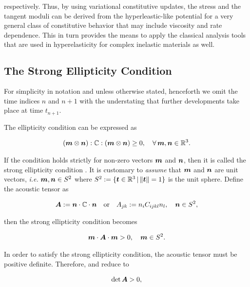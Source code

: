 \documentclass[12pt]{article}
\numberwithin{equation}{section}
\begin{document}
respectively. Thus, by using variational constitutive updates, the
stress and the tangent moduli can be derived from the
hyperleastic-like potential 
for a very general class of constitutive behavior that may include
viscosity and rate dependence. This in turn provides the means to
apply the classical analysis tools that are used in hyperelasticity
for complex inelastic materials as well.

\subsection{The Strong Ellipticity Condition}

For simplicity in notation and unless otherwise stated, henceforth we
omit the time indices $n$ and $n+1$ with the understating that further
developments take place at time $t_{n+1}$.

The ellipticity condition can be expressed as

\begin{equation} \label{eq:strong-ellipticity}
  ({\boldsymbol{m}} \otimes {\boldsymbol{n}}) : \mathbb{C} : ({\boldsymbol{m}} \otimes {\boldsymbol{n}}) \ge 0,
  \quad
  \forall \, {\boldsymbol{m}}, {\boldsymbol{n}} \in \mathbb{R}^3.
\end{equation}

If the condition holds strictly for non-zero vectors ${\boldsymbol{m}}$ and ${\boldsymbol{n}}$,
then it is called the strong ellipticity condition
\citep{Hadamard:1903, Truesdell.Noll:2004,
  Miehe.etal:2004}. It is customary to \emph{assume} that
${\boldsymbol{m}}$ and ${\boldsymbol{n}}$ are unit vectors, \emph{i.e.} ${\boldsymbol{m}}, {\boldsymbol{n}} \in S^2$ where
$S^2 := \{ {\boldsymbol{t}} \in \mathbb{R}^3 \, | \, \| {\boldsymbol{t}} \| = 1\}$ is the unit
sphere. Define the acoustic tensor as

\begin{equation} \label{eq:acoustic-tensor}
  {\boldsymbol{A}} := {\boldsymbol{n}} \cdot \mathbb{C} \cdot {\boldsymbol{n}}
  \quad \text{or} \quad
  A_{jk} := n_i C_{ijkl} n_l,
  \quad
  {\boldsymbol{n}} \in S^2,
\end{equation}

then the strong ellipticity condition becomes

\begin{equation} \label{eq:acoustic-ellipticity}
  {\boldsymbol{m}} \cdot {\boldsymbol{A}} \cdot {\boldsymbol{m}} > 0, \quad {\boldsymbol{m}} \in S^2.
\end{equation}

In order to satisfy the strong ellipticity condition, the acoustic
tensor must be positive definite. Therefore,
 and 
reduce to

\begin{equation} \label{eq:acoustic-determinant}
  \det {\boldsymbol{A}} > 0,
\end{equation}
\end{document}
